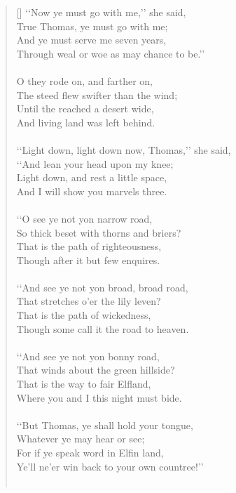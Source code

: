 \documentclass[a4paper]{article}
\begin{document}
\begin{verse}[\versewidth]
    \lq\lq Now ye must go with me,\rq\rq{} she said, \\ 
    \la\la True Thomas, ye must go with me; \\ 
    And ye must serve me seven years, \\ 
    Through weal or woe as may chance to be.\rq\rq{}\\ \\ 

    O they rode on, and farther on, \\ 
    The steed flew swifter than the wind;\\ 
    Until the reached a desert wide, \\ 
    And living land was left behind. \\ \\

    \lq\lq Light down, light down now, Thomas,\rq\rq{} she said, \\ 
    \lq\lq And lean your head upon my knee; \\ 
    Light down, and rest a little space, \\ 
    And I will show you marvels three. \\ \\

    \lq\lq O see ye not yon narrow road, \\ 
    So thick beset with thorns and briers? \\ 
    That is the path of righteousness, \\ 
    Though after it but few enquires. \\ \\

    \lq\lq And see ye not yon broad, broad road, \\ 
    That stretches o\rq{}er the lily leven? \\ 
    That is the path of wickedness, \\ 
    Though some call it the road to heaven. \\ \\ 

    \lq\lq And see ye not yon bonny road, \\ 
    That winds about the green hillside? \\ 
    That is the way to fair Elfland, \\ 
    Where you and I this night must bide. \\ \\ 

    \lq\lq But Thomas, ye shall hold your tongue, \\ 
    Whatever ye may hear or see; \\ 
    For if ye speak word in Elfin land, \\ 
    Ye\rq{}ll ne\rq{}er win back to your own countree!\rq\rq{} \\ \\ 


\end{verse}
\end{document}

